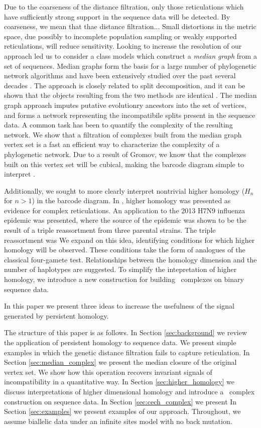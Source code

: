 Due to the coarseness of the distance filtration, only those reticulations which have sufficiently strong support in the sequence data will be detected.
By coarseness, we mean that thae distance filtration...
Small distortions in the metric space, due possibly to incomplete population sampling or weakly supported reticulations, will reduce sensitivity.
Looking to increase the resolution of our approach led us to consider a class models which construct a \emph{median graph} from a set of sequences.
Median graphs form the basis for a large number of phylogenetic network algorithms and have been extensively studied over the past several decades \autocite{Bandelt:1999}.
The approach is closely related to split decomposition, and it can be shown that the objects resulting from the two methods are identical \autocite{Bandelt:1992}.
The median graph approach imputes putative evolutionry ancestors into the set of vertices, and forms a network representing the incompatibile splits present in the sequence data.
A common task has been to quantify the complexity of the resulting network.
We show that a filtration of complexes built from the median graph vertex set is a fast an efficient way to characterize the complexity of a phylogenetic network.
Due to a result of Gromov, we know that the complexes built on this vertex set will be cubical, making the barcode diagram simple to interpret \citet{Gromov:1987}.

Additionally, we sought to more clearly interpret nontrivial higher homology ($H_{n}$ for $n>1$) in the barcode diagram.
In \citet{Chan:2013}, higher homology was presented as evidence for complex reticulations.
An application to the 2013 H7N9 influenza epidemic was presented, where the source of the epidemic was shown to be the result of a triple reassortment from three parental strains.
The triple reassortment was 
We expand on this idea, identifying conditions for which higher homology will be observed.
These conditions take the form of analogues of the classical four-gamete test.
Relationships between the homology dimension and the number of haplotypes are suggested.
To simplify the intepretation of higher homology, we introduce a new construction for building \Cech\ complexes on binary sequence data.

In this paper we present three ideas to increase the usefulness of the signal generated by persistent homology.

The structure of this paper is as follows.
In Section \ref{sec:background} we review the application of persistent homology to sequence data.
We present simple examples in which the genetic distance filtration fails to capture reticulation.
In Section \ref{sec:median_complex} we present the median closure of the original vertex set.
We show how this operation recovers invariant signals of incompatibility in a quantitative way.
In Section \ref{sec:higher_homology} we discuss interpretations of higher dimensional homology and introduce a \Cech\ complex construction on sequence data.
In Section \ref{sec:cech_complex} we present
In Section \ref{sec:examples} we present examples of our approach.
Throughout, we assume biallelic data under an infinite sites model with no back mutation.

